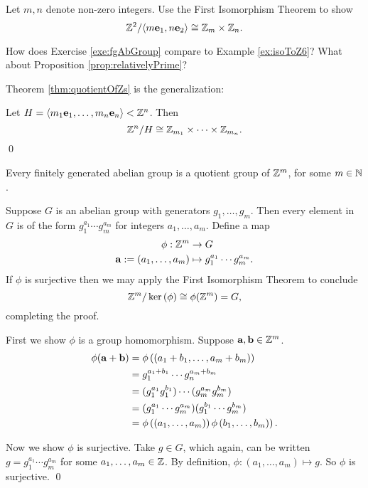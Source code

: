 \documentclass[../algebraNotesMSRI-UP2016.tex]{subfiles}
\begin{document}
\begin{frame}[c]
\begin{exe}[cf. Problem 75]\label{exe:fgAbGroup}
Let $m,n$ denote non-zero integers. Use the First Isomorphism Theorem to show
\[
\mathbb Z^2/\langle m\mathbf e_1,n\mathbf e_2\rangle\cong \mathbb Z_m\times \mathbb Z_n.
\]
\end{exe}
\begin{que}
How does Exercise \ref{exe:fgAbGroup} compare to Example \ref{ex:isoToZ6}?  What about Proposition \ref{prop:relativelyPrime}?
\end{que}
\end{frame}

\begin{frame}[c]{}
Theorem \ref{thm:quotientOfZs} is the generalization:

\smallGap
\begin{thm}\label{thm:quotientOfZs}
Let $H=\langle m_1\mathbf e_1,\dots,m_n\mathbf e_n\rangle< \mathbb Z^n$.  Then
\[
\mathbb Z^n/H\cong \mathbb Z_{m_1}\times\cdots\times\mathbb Z_{m_n}.
\]
\qed
\end{thm}
\end{frame}

\begin{frame}{}{}
\begin{prop}\label{prop:fgab}
Every finitely generated abelian group is a quotient group of $\mathbb Z^m$, for some $m\in \mathbb N$.
\end{prop}

\smallGap
\bigProof
Suppose $G$ is an abelian group with generators $g_1,\dots,g_m$.  Then every element in $G$ is of the form $g_1^{a_1}\cdots g_m^{a_m}$ for integers $a_1,\dots,a_m$.  Define a map
\begin{align*}
\phi: \mathbb Z^m &\to G \\
\mathbf a:=(a_1,\dots,a_m) &\mapsto g_1^{a_1}\cdots g_m^{a_m}.
\end{align*}
If $\phi$ is surjective then we may apply the First Isomorphism Theorem to conclude
\[
\mathbb Z^m/\ker{(\phi)}\cong \phi(\mathbb Z^m)=G,
\]
completing the proof.
\end{frame}

\begin{frame}
First we show $\phi$ is a group homomorphism.  Suppose $\mathbf a,\mathbf b\in \mathbb Z^m$.
\begin{align*}
\phi(\mathbf a+\mathbf b) &= \phi\left((a_1+b_1,\dots,a_m+b_m)\right) \\
	&= g_1^{a_1+b_1}\cdots g_n^{a_m+b_m} \\
	&= (g_1^{a_1}g_1^{b_1})\cdots(g_m^{a_m}g_m^{b_m}) \\
	&= (g_1^{a_1}\cdots g_m^{a_m})(g_1^{b_1}\cdots g_m^{b_m}) \\
	&= \phi\left((a_1,\dots,a_m)\right)\phi\left(b_1,\dots,b_m)\right).
\end{align*}

\smallGap
Now we show $\phi$ is surjective.  Take $g\in G$, which again, can be written $g=g_1^{a_1}\cdots g_m^{a_m}$ for some $a_1,\dots,a_m\in \mathbb Z$.  By definition, $\phi:(a_1,\dots,a_m)\mapsto g$.  So $\phi$ is surjective.
\qed
\end{frame}
\end{document}
